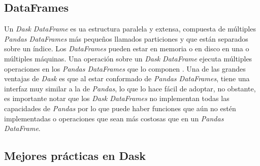 \subsection{DataFrames}

Un \textit{Dask DataFrame} es ua estructura paralela y extensa, compuesta de múltiples \textit{Pandas DataFrames} más pequeños llamados particiones y que están separados sobre un índice. Los \textit{DataFrames} pueden estar en memoria o en disco en una o múltiples máquinas. Una operación sobre un \textit{Dask DataFrame} ejecuta múltiples operaciones en los \textit{Pandas DataFrames} que lo componen \cite{daskdataframe}. Una de las grandes ventajas de \textit{Dask} es que al estar conformado de \textit{Pandas DataFrames}, tiene una interfaz muy similar a la de \textit{Pandas}, lo que lo hace fácil de adoptar, no obstante, es importante notar que los \textit{Dask DataFrames} no implementan todas las capacidades de \textit{Pandas} por lo que puede haber funciones que aún no estén implementadas o operaciones que sean más costosas que en un \textit{Pandas DataFrame}.


\subsection{Mejores prácticas en Dask}

